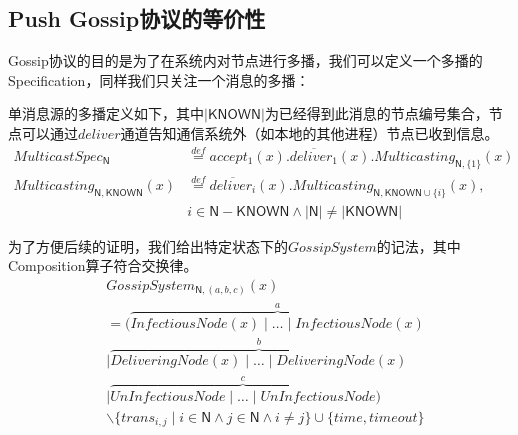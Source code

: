 \subsection{Push Gossip协议的等价性}

Gossip协议的目的是为了在系统内对节点进行多播，我们可以定义一个多播的Specification，同样我们只关注一个消息的多播：
\begin{definition} 单消息源的多播定义如下，其中$|\mathsf{KNOWN}|$为已经得到此消息的节点编号集合，节点可以通过$deliver$通道告知通信系统外（如本地的其他进程）节点已收到信息。
\begin{align*} 
    MulticastSpec_\mathsf{N}&\stackrel{def}{=}accept_1(x).\overline{deliver_1}(x).Multicasting_{\mathsf{N},\{1\}}(x)\\
    Multicasting_{\mathsf{N},\mathsf{KNOWN}}(x)&\stackrel{def}{=}\overline{deliver_i}(x).Multicasting_{\mathsf{N},\mathsf{KNOWN}\cup\{i\}}(x), \\
    &i\in \mathsf{N}-\mathsf{KNOWN} \wedge |\mathsf{N}|\neq |\mathsf{KNOWN}|
 \end{align*}
\end{definition} 

 \begin{definition} 为了方便后续的证明，我们给出特定状态下的$GossipSystem$的记法，其中Composition算子符合交换律。
    \begin{align*}
   &GossipSystem_{\mathsf{N},(a,b,c)}(x)\\
   &= (\stackrel{a}{\overbrace{InfectiousNode(x)\mid \dots \mid InfectiousNode(x)}}\\
   &\mid \stackrel{b}{\overbrace{DeliveringNode(x)\mid \dots\mid DeliveringNode(x)}}\\
   &\mid \stackrel{c}{\overbrace{UnInfectiousNode\mid \dots \mid UnInfectiousNode}})\\
   &\backslash \{trans_{i,j}\mid i\in \mathsf{N} \wedge j\in \mathsf{N} \wedge i\neq j\}\cup \{time, timeout\}
\end{align*}
 \end{definition} 


